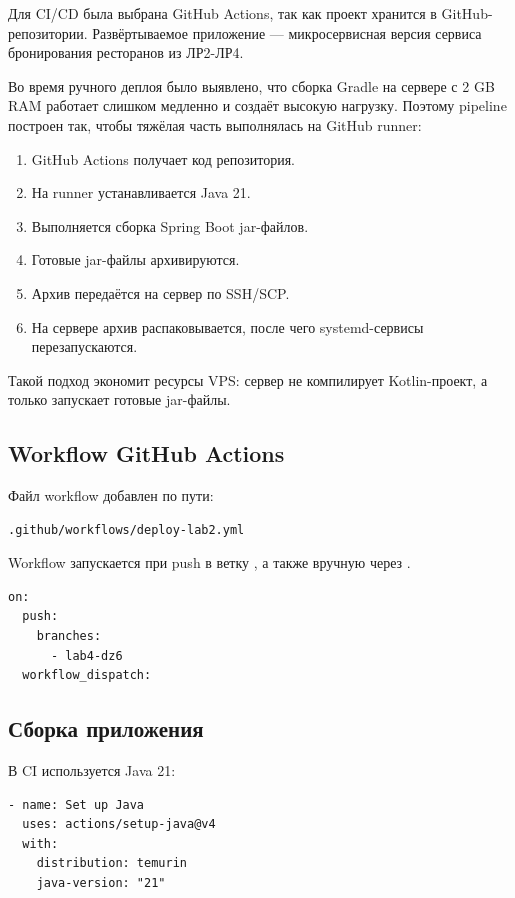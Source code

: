 \documentclass[14pt,a4paper]{extarticle}
\newcommand{\code}[1]{\texttt{\detokenize{#1}}}
\begin{document}
Для CI/CD была выбрана GitHub Actions, так как проект хранится в GitHub-репозитории. Развёртываемое приложение --- микросервисная версия сервиса бронирования ресторанов из ЛР2-ЛР4.

Во время ручного деплоя было выявлено, что сборка Gradle на сервере с 2 GB RAM работает слишком медленно и создаёт высокую нагрузку. Поэтому pipeline построен так, чтобы тяжёлая часть выполнялась на GitHub runner:

\begin{enumerate}[nosep]
    \item GitHub Actions получает код репозитория.
    \item На runner устанавливается Java 21.
    \item Выполняется сборка Spring Boot jar-файлов.
    \item Готовые jar-файлы архивируются.
    \item Архив передаётся на сервер по SSH/SCP.
    \item На сервере архив распаковывается, после чего systemd-сервисы перезапускаются.
\end{enumerate}

Такой подход экономит ресурсы VPS: сервер не компилирует Kotlin-проект, а только запускает готовые jar-файлы.

\subsection{Workflow GitHub Actions}

Файл workflow добавлен по пути:

\begin{lstlisting}[style=codestyle]
.github/workflows/deploy-lab2.yml
\end{lstlisting}

Workflow запускается при push в ветку \code{lab4-dz6}, а также вручную через \code{workflow_dispatch}.

\begin{lstlisting}[style=codestyle]
on:
  push:
    branches:
      - lab4-dz6
  workflow_dispatch:
\end{lstlisting}

\subsection{Сборка приложения}

В CI используется Java 21:

\begin{lstlisting}[style=codestyle]
- name: Set up Java
  uses: actions/setup-java@v4
  with:
    distribution: temurin
    java-version: "21"
\end{lstlisting}
\end{document}
